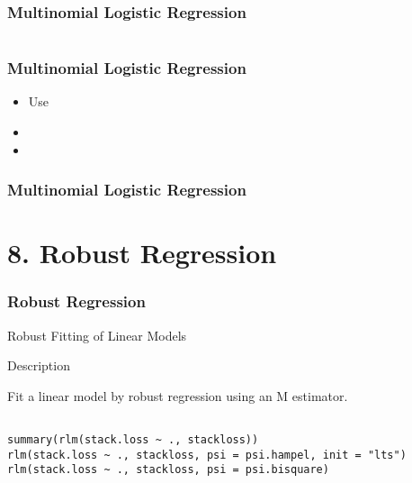 \documentclass{beamer}
\begin{document}
\begin{frame}[fragile]
\frametitle{Multinomial Logistic Regression}
\Large

\begin{framed}
\begin{verbatim}

\end{verbatim}
\end{framed}


\end{frame}

\begin{frame}[fragile]
\frametitle{Multinomial Logistic Regression}
\Large

\begin{itemize}
\item Use
\item
\item
\end{itemize}

\end{frame}



\begin{frame}[fragile]
\frametitle{Multinomial Logistic Regression}
\Large


\end{frame}
\section*{8. Robust Regression}
\begin{frame}[fragile]
\frametitle{Robust Regression}
\Large

Robust Fitting of Linear Models

Description

Fit a linear model by robust regression using an M estimator.
\begin{framed}
\begin{verbatim}

summary(rlm(stack.loss ~ ., stackloss))
rlm(stack.loss ~ ., stackloss, psi = psi.hampel, init = "lts")
rlm(stack.loss ~ ., stackloss, psi = psi.bisquare)
\end{verbatim}
\end{framed}


\end{frame}
\end{document}
